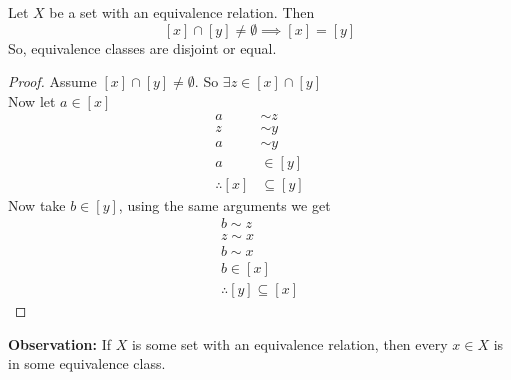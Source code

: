 \documentclass[openany]{report}
\begin{document}
\begin{theorem}
Let $X$ be a set with an equivalence relation. Then 
$$[x] \cap [y] \neq \emptyset \implies [x] = [y]$$
So, equivalence classes are disjoint or equal.
\end{theorem}
\begin{proof}
Assume $[x] \cap [y] \neq \emptyset$. So $\exists z \in [x] \cap [y]$\\
Now let $a \in [x]$
\begin{align*}
    a &\sim z\tag{since $z\in[x]$ , $z \sim x \sim a$}\\
    z &\sim y\tag{since $z \in [y]$}\\
    a &\sim y\tag{transitivity}\\
    a &\in [y]\\
    \therefore [x] &\subseteq [y]
\end{align*}
Now take $b \in [y]$, using the same arguments we get
\begin{align*}
    b \sim z\tag{since $z\in[y]$ , $z \sim y \sim b$}\\
    z \sim x\tag{since $z \in [x]$}\\
    b \sim x\tag{transitivity}\\
    b \in [x]\\
    \therefore [y] \subseteq [x]
\end{align*}
\end{proof}
\noindent
\textbf{Observation:} If $X$ is some set with an equivalence relation, then every $x \in X$ is in some equivalence class.
\end{document}
